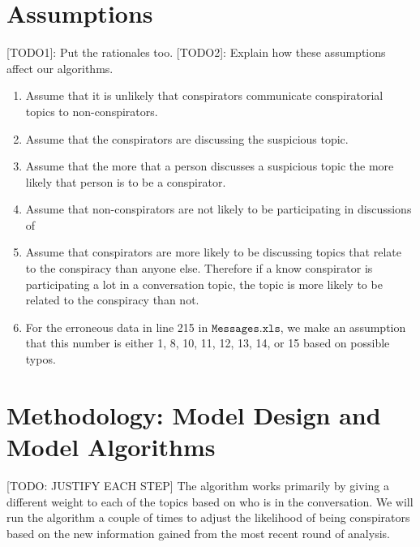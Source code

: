 \documentclass{icmmcm}
\begin{document}
\section{Assumptions}
[TODO1]: Put the rationales too.
[TODO2]: Explain how these assumptions affect our algorithms.
\begin{enumerate}
\item Assume that it is unlikely that conspirators communicate
conspiratorial topics to non-conspirators.

\item Assume that the conspirators are discussing the suspicious topic.

\item Assume that the more that a person discusses a suspicious topic the more likely that person is to be a conspirator.  
\item Assume that non-conspirators are not likely to be participating in discussions of 

\item Assume that conspirators are more likely to be discussing topics that relate to the conspiracy than anyone else.
Therefore if a know conspirator is participating a lot in a conversation topic,
the topic is more likely to be related to the conspiracy than not. 

\item For the erroneous data in line 215 in $\mathtt{Messages.xls}$, 
we make an assumption that this number is either 1, 8, 10, 11, 12, 13, 14, or 15
based on possible typos.
\end{enumerate}
\section{Methodology: Model Design and Model Algorithms}
[TODO: JUSTIFY EACH STEP]
The algorithm works primarily by giving a different weight to each of the 
topics based on who is in the conversation. We will run the algorithm
a couple of times to adjust the likelihood of being conspirators
based on the new information gained from the most 
recent round of analysis.
\end{document}

